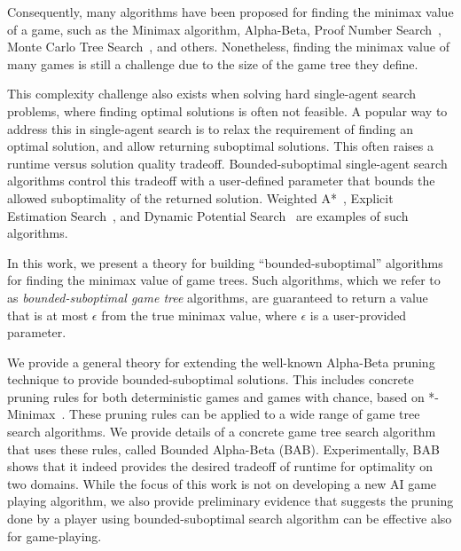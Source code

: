 \documentclass[letterpaper]{article} %
\begin{document}
Consequently, many algorithms have been proposed for finding the minimax value of a game, such as the Minimax algorithm, Alpha-Beta, Proof Number Search~\cite{allis1994proof}, Monte Carlo Tree Search~\cite{coulom2006efficient,kocsis2006bandit,lanctot2013monte}, and others. 
Nonetheless, finding the minimax value of many games is still a challenge due to the size of the game tree they define. 

This complexity challenge also exists when solving hard single-agent search problems, where finding optimal solutions is often not feasible. A popular way to address this in single-agent search is to relax the requirement of finding an optimal solution, and allow returning suboptimal solutions. This often raises a runtime versus solution quality tradeoff. Bounded-suboptimal single-agent search algorithms control this tradeoff with a user-defined parameter that bounds the allowed suboptimality of the returned solution. Weighted A*~\cite{pohl1970heuristic}, Explicit Estimation Search~\cite{thayer2011bounded}, and Dynamic Potential Search~\cite{gilon2016dynamic} are examples of such algorithms. 

In this work, we present a theory for building ``bounded-suboptimal'' algorithms for finding the minimax value of game trees. Such algorithms, which we refer to as \emph{bounded-suboptimal game tree} algorithms, are guaranteed to return a value that is at most $\epsilon$ from the true minimax value, where $\epsilon$ is a user-provided parameter. 


We provide a general theory for extending the well-known Alpha-Beta pruning technique to provide bounded-suboptimal solutions. This includes concrete pruning rules for both deterministic games and games with chance, based on *-Minimax~\cite{ballard1983minimax,hauk2004rediscovering}. These pruning rules can be applied to a wide range of game tree search algorithms. We provide details of a concrete game tree search algorithm that uses these rules, called Bounded Alpha-Beta (BAB). Experimentally, BAB shows that it indeed provides the desired tradeoff of runtime for optimality on two domains. 
While the focus of this work is not on developing a new AI game playing algorithm, we also provide preliminary evidence that suggests the pruning done by a player using bounded-suboptimal search algorithm can be effective also for game-playing. 

\end{document}
